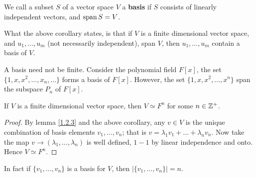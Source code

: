 \begin{definition}
    We call a subset $S$ of a vector space  $V$ a  \textbf{basis} if $S$
    consists of linearly independent vectors, and  $\operatorname{span}{S}=V$.
\end{definition}

What the above corollary states, is that if $V$ is a finite dimensional vector
space, and  $ u_1, \dots, u_m$ (not necessarily independent), span $V$, then  $
u_1, \dots, u_m$ contain a basis of $V$. 

\begin{example}
    A basis need not be finite. Consider the polynomial field  $F[x]$, the set 
    $\{1,x,x^2, \dots, x_n, \dots\}$ forms a basis of $F[x]$. However, the set
    $\{1, x, x^2, \dots, x^n\}$ span the subspace $P_n$ of  $F[x]$.
\end{example} 

\begin{lemma}\label{1.2.5}
    If $V$ is a finite dimensional vector space, then  $V \simeq F^n$ for some
    $n \in \mathbb{Z}^+$.
\end{lemma}
\begin{proof}
    By lemma \ref{1.2.3} and the above corollary, any $v \in V$ is the unique
    combination of basis elements  $ v_1, \dots, v_n$; that is
    $v=\lambda_1v_1+\dots+\lambda_nv_n$. Now take the map $v \rightarrow
    (\lambda_1, \dots, \lambda_n)$ is well defined, $1-1$ by linear independence
    and onto. Hence  $V \simeq F^n$.
\end{proof}
\begin{remark} 
    In fact if $\{v_1, \dots, v_n\}$ is a basis for $V$, then  $|\{v_1, \dots,
    v_n\}|=n$.
\end{remark}

